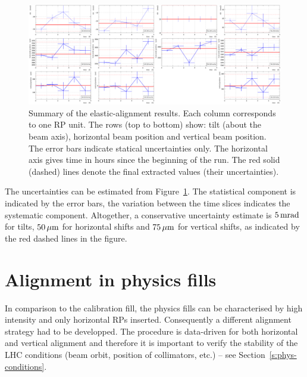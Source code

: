 \documentclass[TOTEM]{cern/cernphprep}
\def\un#1{\,{\rm #1}}
\begin{document}
\begin{figure}[h!]
\begin{center}
\includegraphics[width=\hsize]{fig/calibration_fill/el_alignment.pdf}
\caption{%
Summary of the elastic-alignment results. Each column corresponds to one RP unit. The rows (top to bottom) show: tilt (about the beam axis), horizontal beam position and vertical beam position. The error bars indicate statical uncertainties only. The horizontal axis gives time in hours since the beginning of the run. The red solid (dashed) lines denote the final extracted values (their uncertainties).
}
\label{fig:el_alignment_results}
\end{center}
\end{figure}

The uncertainties can be estimated from Figure~\ref{fig:el_alignment_results}. The statistical component is indicated by the error bars, the variation between the time slices indicates the systematic component. Altogether, a conservative uncertainty estimate is $5\un{mrad}$ for tilts, $50\un{\mu m}$ for horizontal shifts and $75\un{\mu m}$ for vertical shifts, as indicated by the red dashed lines in the figure.


\section{Alignment in physics fills}
\label{s:phys}

In comparison to the calibration fill, the physics fills can be characterised by high intensity and only horizontal RPs inserted. Consequently a different alignment strategy had to be developped. The procedure is data-driven for both horizontal and vertical alignment and therefore it is important to verify the stability of the LHC conditions (beam orbit, position of collimators, etc.) -- see Section~\ref{s:phys-conditions}.
\end{document}
